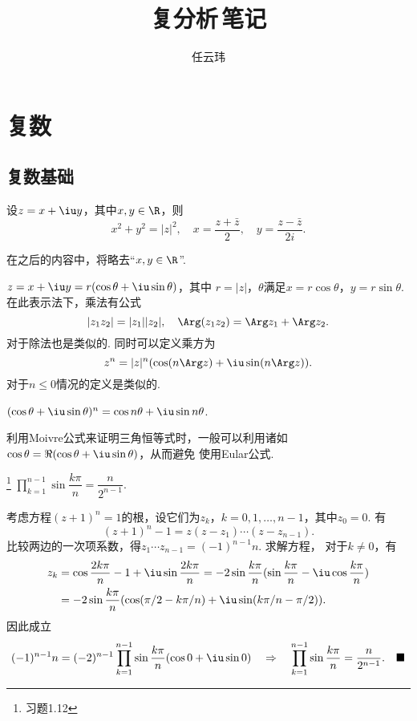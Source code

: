 

\title{复分析$\,$笔记}
\author{任云玮}
\date{}



\maketitle
\tableofcontents
\newpage

\section{复数}

\subsection{复数基础}

  \begin{pos}
    设$z=x+\iu y$，其中$x, y\in\R$，则
    \[
      x^2 + y^2 = |z|^2,\quad x = \frac{z+\bar{z}}{2},\quad
      y = \frac{z-\bar{z}}{2i}.
    \]
  \end{pos}
  \remark
    在之后的内容中，将略去“$x,y\in\R$”.

  \begin{pos}[三角表示法]
    $z = x+\iu y = r(\cos\theta + \iu\sin\theta)$，其中
    $r=|z|$，$\theta$满足$x=r\cos\theta$，$y=r\sin\theta$.
    在此表示法下，乘法有公式
    \[
      |z_1z_2| = |z_1||z_2|,\quad \Arg(z_1z_2) = \Arg z_1 + \Arg z_2.
    \]
    对于除法也是类似的. 同时可以定义乘方为
    \[
      z^n = |z|^n(\cos(n\Arg z) + \iu\sin(n\Arg z)).
    \]
    对于$n\le 0$情况的定义是类似的.
  \end{pos}

  \begin{thm}[Moivre公式]
    \label{thm: Moivre公式}
    $(\cos\theta + \iu\sin\theta)^n = \cos n\theta + \iu\sin n\theta$.
  \end{thm}
  \remark
    利用Moivre公式来证明三角恒等式时，一般可以利用诸如
    $\cos\theta = \Re(\cos\theta + \iu\sin\theta)$，从而避免
    使用Eular公式.

  \begin{pos}\footnote{习题1.12}
    $\prod\limits_{k=1}^{n-1}\sin\dfrac{k\pi}{n}=\dfrac{n}{2^{n-1}}$.
  \end{pos}
  \proof
    考虑方程$(z+1)^n=1$的根，设它们为$z_k$，$k=0,1,\dots,n-1$，其中$z_0=0$.
    有
    \[
      (z+1)^n-1 = z(z-z_1)\cdots(z-z_{n-1}).
    \]
    比较两边的一次项系数，得$z_1\cdots z_{n-1}=(-1)^{n-1}n$. 求解方程，
    对于$k\ne 0$，有
    \[\begin{split}
      z_k &= \cos\frac{2k\pi}{n}-1 + \iu\sin\frac{2k\pi}{n}
          = -2\sin\frac{k\pi}{n}(\sin\frac{k\pi}{n} - \iu\cos\frac{k\pi}{n}) \\
          &= -2\sin\frac{k\pi}{n}(\cos(\pi/2-k\pi/n) + \iu\sin(k\pi/n-\pi/2)).
    \end{split}\]
    因此成立
    \[\begin{split}
      (-1)^{n-1}n = (-2)^{n-1}\prod_{k=1}^{n-1}\sin\frac{k\pi}{n}(\cos 0 + \iu\sin 0)
      \quad\Rightarrow\quad \prod_{k=1}^{n-1}\sin\frac{k\pi}{n} = \frac{n}{2^{n-1}}.
      \quad\blacksquare
    \end{split}\]


